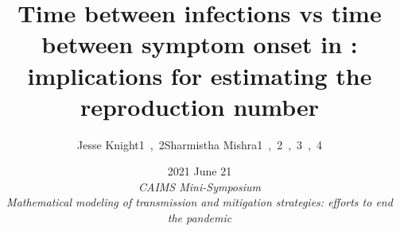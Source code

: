 \title[Estimating the reproduction number of \covid]
{Time between infections vs time between symptom onset in \covid:\\
  implications for estimating the reproduction number}
\def\url{github.com/mishra-lab/covid-r}
\author[Jesse Knight, Sharmistha Mishra
]{Jesse Knight\si{1,2}\enspace Sharmistha Mishra\si{1,2,3,4}}
\date{{2021 June 21}\\[1ex]\scriptsize
  \textit{CAIMS Mini-Symposium\\{Mathematical modeling of \covid transmission and mitigation strategies: efforts to end the pandemic}}}

